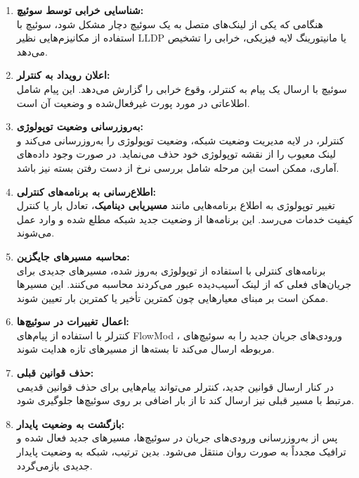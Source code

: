 \begin{enumerate}
	\item \textbf{شناسایی خرابی توسط سوئیچ:} \\
	هنگامی که یکی از لینک‌های متصل به یک سوئیچ دچار مشکل شود، سوئیچ با استفاده از مکانیزم‌هایی نظیر {LLDP} یا مانیتورینگ لایه فیزیکی، خرابی را تشخیص می‌دهد.
	
	\item \textbf{اعلان رویداد به کنترلر:} \\
	سوئیچ با ارسال یک پیام به کنترلر، وقوع خرابی را گزارش می‌دهد. این پیام شامل اطلاعاتی در مورد پورت غیرفعال‌شده و وضعیت آن است.
	
	\item \textbf{به‌روزرسانی وضعیت توپولوژی:} \\
	کنترلر، در لایه مدیریت وضعیت شبکه، وضعیت توپولوژی را به‌روزرسانی می‌کند و لینک معیوب را از نقشه توپولوژی خود حذف می‌نماید. در صورت وجود داده‌های آماری، ممکن است این مرحله شامل بررسی نرخ از دست رفتن بسته نیز باشد.
	
	\item \textbf{اطلاع‌رسانی به برنامه‌های کنترلی:} \\
	تغییر توپولوژی به اطلاع برنامه‌هایی مانند \textbf{مسیریابی دینامیک}، {تعادل بار} یا کنترل کیفیت خدمات می‌رسد. این برنامه‌ها از وضعیت جدید شبکه مطلع شده و وارد عمل می‌شوند.
	
	\item \textbf{محاسبه مسیرهای جایگزین:} \\
	برنامه‌های کنترلی با استفاده از توپولوژی به‌روز شده، مسیرهای جدیدی برای جریان‌های فعلی که از لینک آسیب‌دیده عبور می‌کردند محاسبه می‌کنند. این مسیرها ممکن است بر مبنای معیارهایی چون {کمترین تأخیر} یا {کمترین بار} تعیین شوند.
	
	\item \textbf{اعمال تغییرات در سوئیچ‌ها:} \\
	کنترلر با استفاده از پیام‌های {FlowMod} ، ورودی‌های جریان جدید را به سوئیچ‌های مربوطه ارسال می‌کند تا بسته‌ها از مسیرهای تازه هدایت شوند.
	
	\item \textbf{حذف قوانین قبلی:} \\
	در کنار ارسال قوانین جدید، کنترلر می‌تواند پیام‌هایی برای حذف قوانین قدیمی مرتبط با مسیر قبلی نیز ارسال کند تا از بار اضافی بر روی سوئیچ‌ها جلوگیری شود.
	
	\item \textbf{بازگشت به وضعیت پایدار:} \\
	پس از به‌روزرسانی ورودی‌های جریان در سوئیچ‌ها، مسیرهای جدید فعال شده و ترافیک مجدداً به صورت روان منتقل می‌شود. بدین ترتیب، شبکه به وضعیت پایدار جدیدی بازمی‌گردد.
\end{enumerate}

